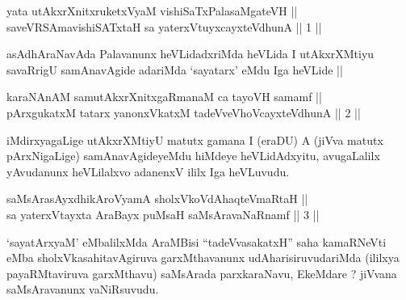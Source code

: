 

\begin{shl}
yata utAkxrXnitxruketxVyaM vishiSaTxPalasaMgateVH || \\
saveVRSAmavishiSATx\s taH sa yaterxVtuyxcayxteV\s dhunA \hfill || 1 ||
  
\end{shl}

\begin{artha}
asAdhAraNavAda Palavanunx heVLidadxriMda heVLida I utAkxrXMtiyu
savaRrigU samAnavAgide adariMda `sayatarx' eMdu Iga heVLide ||
\end{artha}


\begin{shl}
karaNAnAM samutAkxrXnitxgaRmanaM ca tayoVH samamf || \\
pArxgukatxM tatarx yanonxVkatxM tadeVveVhoVcayxteV\s dhunA \hfill || 2 ||
  
\end{shl}

\begin{artha}
iMdirxyagaLige utAkxrXMtiyU matutx gamana I (eraDU) A (jiVva matutx
pArxNigaLige) samAnavAgideyeMdu hiMdeye heVLidAdxyitu, avugaLalilx
yAvudanunx heVLilalxvo adanenxV ililx Iga heVLuvudu.
\end{artha}


\begin{shl}
saMsArasAyxdhikAroV\s yamA sholxVkoVdAhaqteVmaRtaH || \\
sa yaterxVtayxta AraBayx puMsaH saMsAravaNaRnamf \hfill || 3 ||
  
\end{shl}

\begin{artha}
`sayatArxyaM' eMbalilxMda AraMBisi ``tadeVvasakatxH'' saha kamaRNeVti
eMba sholxVkasahitavAgiruva garxMthavanunx udAharisiruvudariMda
(ililxya payaRMtaviruva garxMthavu) saMsArada parxkaraNavu,
EkeMdare ? jiVvana saMsAravanunx vaNiRsuvudu.
\end{artha}


